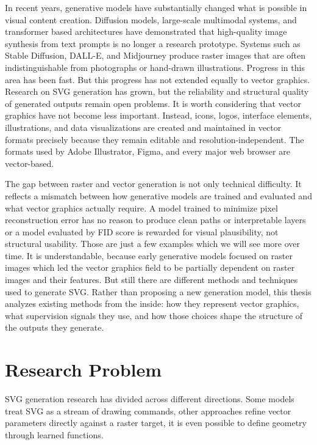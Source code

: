 In recent years, generative models have substantially changed what 
is possible in visual content creation. Diffusion models, large-scale 
multimodal systems, and transformer based architectures have demonstrated 
that high-quality image synthesis from text prompts is no longer 
a research prototype. Systems such as Stable Diffusion, DALL-E, and 
Midjourney produce raster images that are often indistinguishable from 
photographs or hand-drawn illustrations. Progress in this area has been 
fast. But this progress has not extended equally to vector graphics. 
Research on SVG generation has grown, but the reliability and structural 
quality of generated outputs remain open problems. It is worth considering that 
vector graphics have not become less important. Instead, icons, logos, 
interface elements, illustrations, and data visualizations are created 
and maintained in vector formats precisely because they remain editable 
and resolution-independent. The formats used by Adobe Illustrator, 
Figma, and every major web browser are vector-based.



The gap between raster and vector generation is not only technical 
difficulty. It reflects a mismatch between how 
generative models are trained and evaluated and what vector graphics 
actually require. A model trained to minimize pixel reconstruction error 
has no reason to produce clean paths or interpretable layers or a model 
evaluated by FID score is rewarded for visual plausibility, not 
structural usability. Those are just a few examples which we will see 
more over time. It is understandable, because early generative 
models focused on raster images which led the vector graphics 
field to be partially dependent on raster images and their features. 
But still there are different methods and techniques used to generate 
SVG. Rather than proposing a new 
generation model, this thesis analyzes existing methods from the inside: 
how they represent vector graphics, what supervision signals they use, 
and how those choices shape the structure of the outputs they generate.

\section{Research Problem}

SVG generation research has divided across different directions. 
Some models treat SVG as a stream of drawing commands, other approaches
refine vector parameters directly against a raster target,
it is even possible to define geometry through learned functions. 

